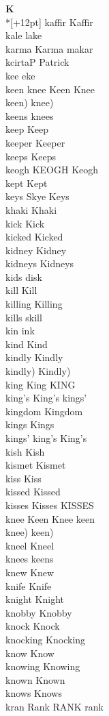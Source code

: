 \vspace{14pt}
\noindent\textbf{\Large K}\\*[+12pt]
kaffir Kaffir\\
kale lake\\
karma Karma makar\\
kcirtaP Patrick\\
kee eke\\
keen knee Keen Knee\\
keen) knee)\\
keens knees\\
keep Keep\\
keeper Keeper\\
keeps Keeps\\
keogh KEOGH Keogh\\
kept Kept\\
keys Skye Keys\\
khaki Khaki\\
kick Kick\\
kicked Kicked\\
kidney Kidney\\
kidneys Kidneys\\
kids disk\\
kill Kill\\
killing Killing\\
kills skill\\
kin ink\\
kind Kind\\
kindly Kindly\\
kindly) Kindly)\\
king King KING\\
king's King's kings'\\
kingdom Kingdom\\
kings Kings\\
kings' king's King's\\
kish Kish\\
kismet Kismet\\
kiss Kiss\\
kissed Kissed\\
kisses Kisses KISSES\\
knee Keen Knee keen\\
knee) keen)\\
kneel Kneel\\
knees keens\\
knew Knew\\
knife Knife\\
knight Knight\\
knobby Knobby\\
knock Knock\\
knocking Knocking\\
know Know\\
knowing Knowing\\
known Known\\
knows Knows\\
kran Rank RANK rank\\

